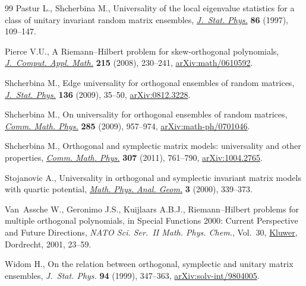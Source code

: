 \documentclass[pdftex]{sigma}
\numberwithin{equation}{section}
\begin{document}
\begin{thebibliography}{99}
Pastur L., Shcherbina M., Universality of the local eigenvalue statistics for a
 class of unitary invariant random matrix ensembles, \href{https://doi.org/10.1007/BF02180200}{\textit{J.~Stat. Phys.}}
 \textbf{86} (1997), 109--147.

Pierce V.U., A {R}iemann--{H}ilbert problem for skew-orthogonal polynomials,
 \href{https://doi.org/10.1016/j.cam.2007.04.006}{\textit{J.~Comput. Appl. Math.}} \textbf{215} (2008), 230--241,
 \href{https://arxiv.org/abs/math/0610592}{arXiv:math/0610592}.

Shcherbina M., Edge universality for orthogonal ensembles of random matrices,
 \href{https://doi.org/10.1007/s10955-009-9766-5}{\textit{J.~Stat. Phys.}} \textbf{136} (2009), 35--50, \href{https://arxiv.org/abs/0812.3228}{arXiv:0812.3228}.

Shcherbina M., On universality for orthogonal ensembles of random matrices,
 \href{https://doi.org/10.1007/s00220-008-0648-5}{\textit{Comm. Math. Phys.}} \textbf{285} (2009), 957--974,
 \href{https://arxiv.org/abs/math-ph/0701046}{arXiv:math-ph/0701046}.

Shcherbina M., Orthogonal and symplectic matrix models: universality and other
 properties, \href{https://doi.org/10.1007/s00220-011-1351-5}{\textit{Comm. Math. Phys.}} \textbf{307} (2011), 761--790,
 \href{https://arxiv.org/abs/1004.2765}{arXiv:1004.2765}.

Stojanovic A., Universality in orthogonal and symplectic invariant matrix
 models with quartic potential, \href{https://doi.org/10.1023/A:1011457714198}{\textit{Math. Phys. Anal. Geom.}} \textbf{3}
 (2000), 339--373.

Van~Assche W., Geronimo J.S., Kuijlaars A.B.J., Riemann--{H}ilbert problems for
 multiple orthogonal polynomials, in Special {F}unctions 2000: {C}urrent
 {P}erspective and {F}uture {D}irections, \textit{NATO Sci. Ser.~{II} Math.
 Phys. Chem.}, Vol.~30, \href{https://doi.org/10.1007/978-94-010-0818-1_2}{Kluwer}, Dordrecht, 2001, 23--59.

Widom H., On the relation between orthogonal, symplectic and unitary matrix
 ensembles, \textit{J.~Stat. Phys.} \textbf{94} (1999), 347--363,
 \href{https://arxiv.org/abs/solv-int/9804005}{arXiv:solv-int/9804005}.

\end{thebibliography}\LastPageEnding
\end{document}
